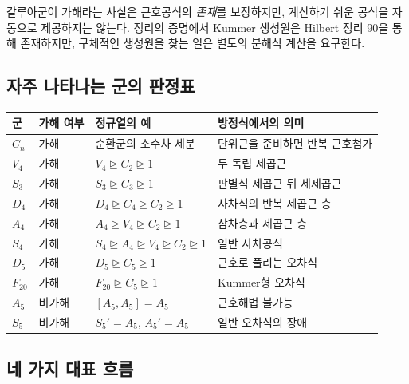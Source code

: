 \begin{pitfall}
갈루아군이 가해라는 사실은 근호공식의 \emph{존재}를 보장하지만, 계산하기 쉬운 공식을 자동으로 제공하지는 않는다. 정리의 증명에서 Kummer 생성원은 Hilbert 정리 90을 통해 존재하지만, 구체적인 생성원을 찾는 일은 별도의 분해식 계산을 요구한다.
\end{pitfall}

\subsection{자주 나타나는 군의 판정표}

\begin{center}
\renewcommand{\arraystretch}{1.22}
\begin{tabular}{p{}p{}p{}p{}}
\toprule
군 & 가해 여부 & 정규열의 예 & 방정식에서의 의미 \\
\midrule
$C_n$ & 가해 & 순환군의 소수차 세분 & 단위근을 준비하면 반복 근호첨가 \\
$V_4$ & 가해 & $V_4\trianglerighteq C_2\trianglerighteq1$ & 두 독립 제곱근 \\
$S_3$ & 가해 & $S_3\trianglerighteq C_3\trianglerighteq1$ & 판별식 제곱근 뒤 세제곱근 \\
$D_4$ & 가해 & $D_4\trianglerighteq C_4\trianglerighteq C_2\trianglerighteq1$ & 사차식의 반복 제곱근 층 \\
$A_4$ & 가해 & $A_4\trianglerighteq V_4\trianglerighteq C_2\trianglerighteq1$ & 삼차층과 제곱근 층 \\
$S_4$ & 가해 & $S_4\trianglerighteq A_4\trianglerighteq V_4\trianglerighteq C_2\trianglerighteq1$ & 일반 사차공식 \\
$D_5$ & 가해 & $D_5\trianglerighteq C_5\trianglerighteq1$ & 근호로 풀리는 오차식 \\
$F_{20}$ & 가해 & $F_{20}\trianglerighteq C_5\trianglerighteq1$ & Kummer형 오차식 \\
$A_5$ & 비가해 & $[A_5,A_5]=A_5$ & 근호해법 불가능 \\
$S_5$ & 비가해 & $S_5' =A_5$, $A_5'=A_5$ & 일반 오차식의 장애 \\
\bottomrule
\end{tabular}
\end{center}

\subsection{네 가지 대표 흐름}

